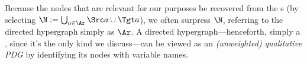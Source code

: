 {{%
Because the
nodes that are relevant for our purposes  
be recovered from the \hyperarc s (by selecting $\N := \bigcup_{a \in \Ar} \Src a \cup \Tgt a$), we often surpress $\N$, referring to the directed hypergraph simply as $\Ar$.
%
A directed hypergraph---henceforth, simply a \hgraph, since it's the only kind we discuss---can be viewed as 
    an \emph{(unweighted) qualitative PDG} \citep{pdg-infer}
    by identifying its nodes with variable names.
%
}}
